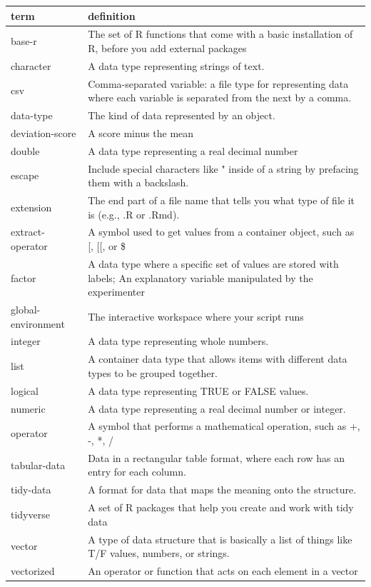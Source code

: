 \documentclass[
  oneside]{book}
\begin{document}
\begin{tabular}{l|l}
\hline
term & definition\\
\hline
base-r & The set of R functions that come with a basic installation of R, before you add external packages\\
\hline
character & A data type representing strings of text.\\
\hline
csv & Comma-separated variable: a file type for representing data where each variable is separated from the next by a comma.\\
\hline
data-type & The kind of data represented by an object.\\
\hline
deviation-score & A score minus the mean\\
\hline
double & A data type representing a real decimal number\\
\hline
escape & Include special characters like " inside of a string by prefacing them with a backslash.\\
\hline
extension & The end part of a file name that tells you what type of file it is (e.g., .R or .Rmd).\\
\hline
extract-operator & A symbol used to get values from a container object, such as [, [[, or \$\\
\hline
factor & A data type where a specific set of values are stored with labels; An explanatory variable manipulated by the experimenter\\
\hline
global-environment & The interactive workspace where your script runs\\
\hline
integer & A data type representing whole numbers.\\
\hline
list & A container data type that allows items with different data types to be grouped together.\\
\hline
logical & A data type representing TRUE or FALSE values.\\
\hline
numeric & A data type representing a real decimal number or integer.\\
\hline
operator & A symbol that performs a mathematical operation, such as +, -, *, /\\
\hline
tabular-data & Data in a rectangular table format, where each row has an entry for each column.\\
\hline
tidy-data & A format for data that maps the meaning onto the structure.\\
\hline
tidyverse & A set of R packages that help you create and work with tidy data\\
\hline
vector & A type of data structure that is basically a list of things like T/F values, numbers, or strings.\\
\hline
vectorized & An operator or function that acts on each element in a vector\\
\hline
\end{tabular}
\end{document}
